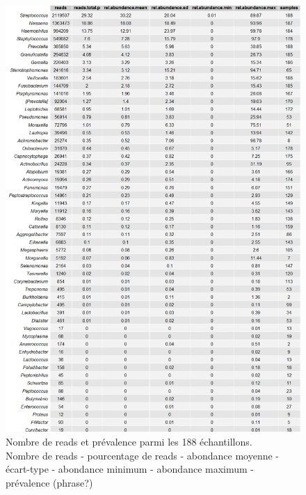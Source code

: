 \documentclass[12pt,a4paper]{article}
\begin{document}
\begin{figure}
\begin{center}
\includegraphics[scale=0.5]{img/all_table.png}\hfill
\end{center}
\caption{Nombre de reads et prévalence parmi les 188 échantillons.\\ Nombre de reads - pourcentage de reads - abondance moyenne - écart-type - abondance minimum - abondance maximum - prévalence (phrase?)}
\label{alltable}
\end{figure}
\end{document}
